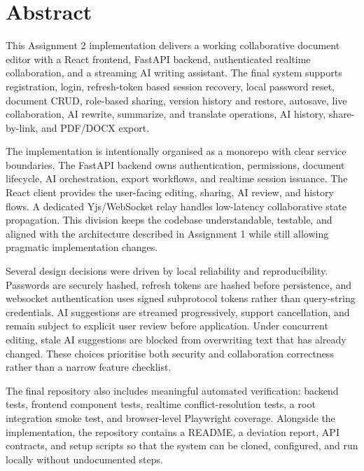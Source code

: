 \chapter*{Abstract}

This Assignment 2 implementation delivers a working collaborative document editor with a React frontend,
FastAPI backend, authenticated realtime collaboration, and a streaming AI writing assistant. The final
system supports registration, login, refresh-token based session recovery, local password reset,
document CRUD, role-based sharing, version history and restore, autosave, live collaboration, AI rewrite,
summarize, and translate operations, AI history, share-by-link, and PDF/DOCX export.

The implementation is intentionally organised as a monorepo with clear service boundaries. The FastAPI
backend owns authentication, permissions, document lifecycle, AI orchestration, export workflows, and
realtime session issuance. The React client provides the user-facing editing, sharing, AI review, and
history flows. A dedicated Yjs/WebSocket relay handles low-latency collaborative state propagation. This
division keeps the codebase understandable, testable, and aligned with the architecture described in
Assignment 1 while still allowing pragmatic implementation changes.

Several design decisions were driven by local reliability and reproducibility. Passwords are securely
hashed, refresh tokens are hashed before persistence, and websocket authentication uses signed
subprotocol tokens rather than query-string credentials. AI suggestions are streamed progressively,
support cancellation, and remain subject to explicit user review before application. Under concurrent
editing, stale AI suggestions are blocked from overwriting text that has already changed. These choices
prioritise both security and collaboration correctness rather than a narrow feature checklist.

The final repository also includes meaningful automated verification: backend tests, frontend component
tests, realtime conflict-resolution tests, a root integration smoke test, and browser-level Playwright
coverage. Alongside the implementation, the repository contains a README, a deviation report, API
contracts, and setup scripts so that the system can be cloned, configured, and run locally without
undocumented steps.

\clearpage
